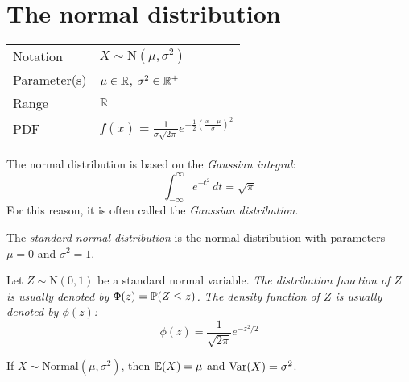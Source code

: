 \section{The normal distribution}
\begin{center}
\begin{tabular}{ll}\hline
Notation			& $X\sim\text{N}(\mu,\sigma^2)$ \\
Parameter(s)		& $\mu\in\mathbb{R}$, $\sigma^2\in\mathbb{R}^{+}$ \\
Range			& $\mathbb{R}$ \\
PDF				& $f(x) = \displaystyle\frac{1}{\sigma\sqrt{2\pi}} e^{-\frac{1}{2}\left(\frac{x-\mu}{\sigma}\right)^2}$ \\[2ex] \hline 
\end{tabular}
\end{center}

The normal distribution is based on the \emph{Gaussian integral}:
\[
\int_{-\infty}^{\infty} e^{-t^2}\,dt = \sqrt{\pi}
\]
For this reason, it is often called the \emph{Gaussian distribution}.

\begin{definition}
The \emph{standard normal distribution} is the normal distribution with parameters $\mu=0$ and $\sigma^2=1$.
\end{definition}

Let $Z\sim\text{N}(0,1)$ be a standard normal variable.
\ben
\it The distribution function of $Z$ is usually denoted by $\Phi(z) = \mathbb{P}(Z\leq z)$.
\it The density function of $Z$ is usually denoted by $\phi(z)$:
\[
\phi(z) = \frac{1}{\sqrt{2\pi}} e^{-z^2/2}
\]
\een

\begin{lemma}
If $X\sim\text{Normal}(\mu,\sigma^2)$, then $\mathbb{E}(X)=\mu$ and $\text{Var}(X)=\sigma^2$.
\end{lemma}

